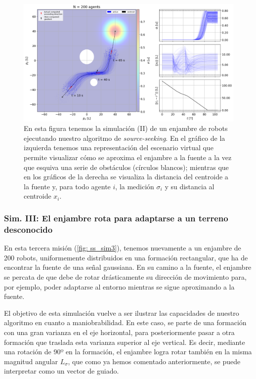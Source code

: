 \begin{figure}[!h]
\centering
\includegraphics[trim={0cm 0.0cm 0cm 0.0cm}, clip, width=1\columnwidth]{./fig/ss_sim2.png}
\caption{En esta figura tenemos la simulación (II) de un enjambre de robots ejecutando nuestro algoritmo de \textit{source-seeking}. En el gráfico de la izquierda tenemos una representación del escenario virtual que permite visualizar cómo se aproxima el enjambre a la fuente a la vez que esquiva una serie de obstáculos (círculos blancos); mientras que en los gráficos de la derecha se visualiza la distancia del centroide a la fuente y, para todo agente $i$, la medición $\sigma_i$ y su distancia al centroide $x_i$.}
\label{fig: ss_sim2}
\end{figure}

\subsubsection*{Sim. III: El enjambre rota para adaptarse a un terreno desconocido}

En esta tercera misión (\autoref{fig: ss_sim3}), tenemos nuevamente a un enjambre de 200 robots, uniformemente distribuidos en una formación rectangular, que ha de encontrar la fuente de una señal gaussiana. En su camino a la fuente, el enjambre se percata de que debe de rotar drásticamente su dirección de movimiento para, por ejemplo, poder adaptarse al entorno mientras se sigue aproximando a la fuente.

El objetivo de esta simulación vuelve a ser ilustrar las capacidades de nuestro algoritmo en cuanto a maniobrabilidad. En este caso, se parte de una formación con una gran varianza en el eje horizontal, para posteriormente pasar a otra formación que traslada esta varianza superior al eje vertical. Es decir, mediante una rotación de 90º en la formación, el enjambre logra rotar también en la misma magnitud angular $L_\sigma$, que como ya hemos comentado anteriormente, se puede interpretar como un vector de guiado.

